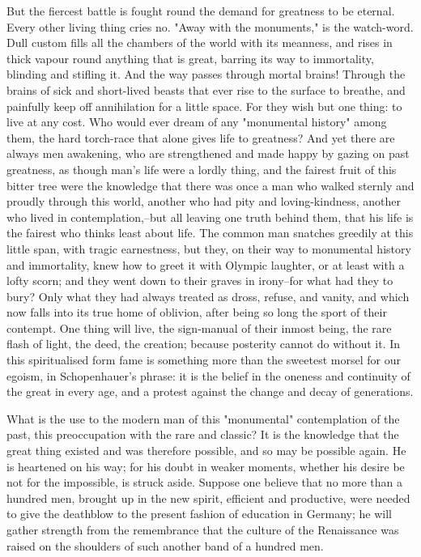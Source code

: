 But the fiercest battle is fought round the demand for greatness to
be eternal. Every other living thing cries no. "Away with the
monuments," is the watch-word. Dull custom fills all the chambers of
the world with its meanness, and rises in thick vapour round anything
that is great, barring its way to immortality, blinding and stifling
it. And the way passes through mortal brains! Through the brains of
sick and short-lived beasts that ever rise to the surface to breathe,
and painfully keep off annihilation for a little space. For they wish
but one thing: to live at any cost. Who would ever dream of any
"monumental history" among them, the hard torch-race that alone gives
life to greatness? And yet there are always men awakening, who are
strengthened and made happy by gazing on past greatness, as though
man's life were a lordly thing, and the fairest fruit of this bitter
tree were the knowledge that there was once a man who walked sternly
and proudly through this world, another who had pity and
loving-kindness, another who lived in contemplation,--but all leaving
one truth behind them, that his life is the fairest who thinks least
about life. The common man snatches greedily at this little span,
with tragic earnestness, but they, on their way to monumental history
and immortality, knew how to greet it with Olympic laughter, or at
least with a lofty scorn; and they went down to their graves in
irony--for what had they to bury? Only what they had always treated
as dross, refuse, and vanity, and which now falls into its true home
of oblivion, after being so long the sport of their contempt. One
thing will live, the sign-manual of their inmost being, the rare
flash of light, the deed, the creation; because posterity cannot do
without it. In this spiritualised form fame is something more than
the sweetest morsel for our egoism, in Schopenhauer's phrase: it is
the belief in the oneness and continuity of the great in every age,
and a protest against the change and decay of generations.

What is the use to the modern man of this "monumental" contemplation
of the past, this preoccupation with the rare and classic? It is the
knowledge that the great thing existed and was therefore possible,
and so may be possible again. He is heartened on his way; for his
doubt in weaker moments, whether his desire be not for the
impossible, is struck aside. Suppose one believe that no more than a
hundred men, brought up in the new spirit, efficient and productive,
were needed to give the deathblow to the present fashion of education
in Germany; he will gather strength from the remembrance that the
culture of the Renaissance was raised on the shoulders of such
another band of a hundred men.

